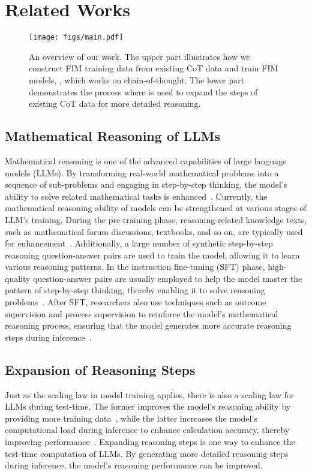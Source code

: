 \section{Related Works}
\begin{figure*}[htbp]
\centering
\texttt{[image: figs/main.pdf]}
\caption{An overview of our work. The upper part illustrates how we construct FIM training data from existing CoT data and train FIM models, \methodname, which works on chain-of-thought. The lower part demonstrates the process where \methodname is used to expand the steps of existing CoT data for more detailed reasoning.}
\label{fig:main}
\end{figure*}


\subsection{Mathematical Reasoning of LLMs}

Mathematical reasoning is one of the advanced capabilities of large language models (LLMs). By transforming real-world mathematical problems into a sequence of sub-problems and engaging in step-by-step thinking, the model’s ability to solve related mathematical tasks is enhanced~\citep{wei2023chainofthought}. Currently, the mathematical reasoning ability of models can be strengthened at various stages of LLM’s training. During the pre-training phase, reasoning-related knowledge texts, such as mathematical forum discussions, textbooks, and so on, are typically used for enhancement~\citep{paster2023openwebmatha, zhang2024autonomous}. Additionally, a large number of synthetic step-by-step reasoning question-answer pairs are used to train the model, allowing it to learn various reasoning patterns. In the instruction fine-tuning (SFT) phase, high-quality question-answer pairs are usually employed to help the model master the pattern of step-by-step thinking, thereby enabling it to solve reasoning problems~\citep{ding2024unleashing, zhou2024jiuzhang30, E-GSM2024Xu}. After SFT, researchers also use techniques such as outcome supervision and process supervision to reinforce the model's mathematical reasoning process, ensuring that the model generates more accurate reasoning steps during inference~\citep{lightman2023lets,pds2024xu, wang2024mathshepherd, zhang2025lessons}.



\subsection{Expansion of Reasoning Steps}
Just as the scaling law in model training applies, there is also a scaling law for LLMs during test-time. The former improves the model’s reasoning ability by providing more training data~\citep{hoffmann2022training}, while the latter increases the model’s computational load during inference to enhance calculation accuracy, thereby improving performance~\citep{brown2024large, snell2024scaling}. Expanding reasoning steps is one way to enhance the test-time computation of LLMs. By generating more detailed reasoning steps during inference, the model’s reasoning performance can be improved.

